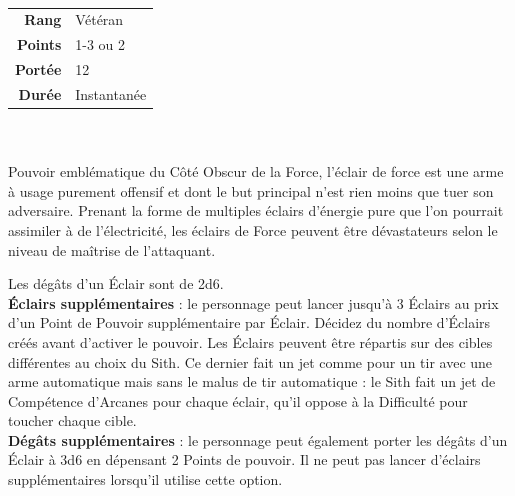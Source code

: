 \begin{description}[align=left] 

    \item [\'Eclairs de Force] ~ \\

        \begin{tabular}{ r l }
            \textbf{Rang}    & Vétéran \\
            \textbf{Points}  & 1-3 ou 2 \\
            \textbf{Portée}  & 12 \\
            \textbf{Durée}   & Instantanée \\
        \end{tabular}
        \\ \\
        Pouvoir emblématique du Côté Obscur de la Force, l'éclair de force est une arme à usage purement offensif et dont le but principal n'est rien moins que tuer son adversaire. Prenant la forme de multiples éclairs d'énergie pure que l'on pourrait assimiler à de l'électricité, les éclairs de Force peuvent être dévastateurs selon le niveau de maîtrise de l'attaquant. 

        Les dégâts d’un Éclair sont de 2d6. \\
        
        \textbf{Éclairs supplémentaires} : le personnage peut lancer jusqu’à 3 Éclairs au prix d’un Point de Pouvoir supplémentaire par Éclair. Décidez du nombre d’Éclairs créés avant d’activer le pouvoir. Les Éclairs peuvent être répartis sur des cibles différentes au choix du Sith. Ce dernier fait un jet comme pour un tir avec une arme automatique mais sans le malus de tir automatique : le Sith fait un jet de Compétence d’Arcanes pour chaque éclair, qu’il oppose à la Difficulté pour toucher chaque cible.\\
        
        \textbf{Dégâts supplémentaires} : le personnage peut également porter les dégâts d’un Éclair à 3d6 en dépensant 2 Points de pouvoir. Il ne peut pas lancer d’éclairs supplémentaires lorsqu’il utilise cette option.
        \\

    \item [\'Etranglement de Force] ~ \\


\end{description}
